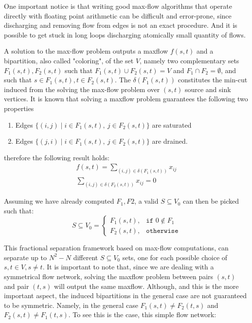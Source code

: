 One important notice is that writing good max-flow algorithms that operate directly with floating point arithmetic can be difficult and error-prone, since discharging and removing flow from edges is not an exact procedure.
And it is possible to get stuck in long loops discharging atomically small quantity of flows.


A solution to the max-flow problem outputs a maxflow $f(s, t)$ and a bipartition, also called "coloring", of the set $V$, namely two complementary sets $F_1(s, t), F_2(s, t)$ such that $F_1(s, t) \cup F_2(s, t) = V$ and $F_1 \cap F_2 = \emptyset$, and such that $s \in F_1(s, t), t \in F_2(s, t)$.
The $\delta(F_1(s, t))$ constitutes the min-cut induced from the solving the max-flow problem over $(s, t)$ source and sink vertices.
It is known that solving a maxflow problem guarantees the following two properties

\begin{enumerate}
	\item Edges $\{ (i, j) \mid i \in F_1(s, t),\ j \in F_2(s, t) \}$ are saturated
	\item Edges $\{ (j, i) \mid i \in F_1(s, t),\ j \in F_2(s, t) \}$ are drained.
\end{enumerate}

therefore the following result holds:
\begin{align}
	f(s, t) = \sum_{(i, j) \in \delta(F_1(s, t))} x_{ij} \\
	\sum_{(i, j) \in \delta(F_2(s, t))} x_{ij} = 0
\end{align}

Assuming we have already computed $F_1, F2$, a valid $S \subseteq V_0$ can then be picked such that:
\begin{equation}
	S \subseteq V_0 =
	\begin{cases}
		F_1(s, t), & \texttt{if } 0 \notin F_1 \\
		F_2(s, t), & \texttt{otherwise}
	\end{cases}
\end{equation}

This fractional separation framework based on max-flow computations, can separate up to $N^2 - N$ different $S \subseteq V_0$ sets, one for each possible choice of $s, t \in V, s \ne t$.
It is important to note that, since we are dealing with a symmetrical flow network, solving the maxflow problem between pairs $(s, t)$ and pair $(t, s)$ will output the same maxflow.
Although, and this is the more important aspect, the induced bipartitions in the general case are not guaranteed to be symmetric.
Namely, in the general case $F_1(s, t) \ne F_2(t, s)$ and $F_2(s, t) \ne F_1(t, s)$.
To see this is the case, this simple flow network:

